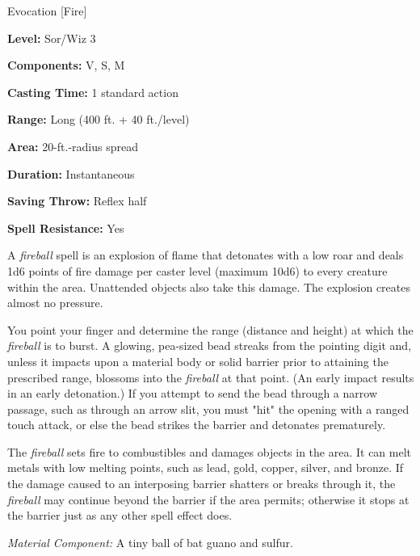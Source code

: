 
Evocation [Fire]

\textbf{Level:} Sor/Wiz 3

\textbf{Components:} V, S, M

\textbf{Casting Time:} 1 standard action

\textbf{Range:} Long (400 ft. + 40 ft./level)

\textbf{Area:} 20-ft.-radius spread

\textbf{Duration:} Instantaneous

\textbf{Saving Throw:} Reflex half

\textbf{Spell Resistance:} Yes

A \textit{fireball} spell is an explosion of flame that detonates with a low roar 
and deals 1d6 points of fire damage per caster level (maximum 10d6) to every creature 
within the area. Unattended objects also take this damage. The explosion creates 
almost no pressure.

You point your finger and determine the range (distance and height) at which the 
\textit{fireball} is to burst. A glowing, pea-sized bead streaks from the pointing 
digit and, unless it impacts upon a material body or solid barrier prior to attaining 
the prescribed range, blossoms into the \textit{fireball} at that point. (An early 
impact results in an early detonation.) If you attempt to send the bead through 
a narrow passage, such as through an arrow slit, you must "hit" the opening with 
a ranged touch attack, or else the bead strikes the barrier and detonates prematurely.

The \textit{fireball} sets fire to combustibles and damages objects in the area. 
It can melt metals with low melting points, such as lead, gold, copper, silver, 
and bronze. If the damage caused to an interposing barrier shatters or breaks through 
it, the \textit{fireball} may continue beyond the barrier if the area permits; 
otherwise it stops at the barrier just as any other spell effect does.

\textit{Material Component:} A tiny ball of bat guano and sulfur.

